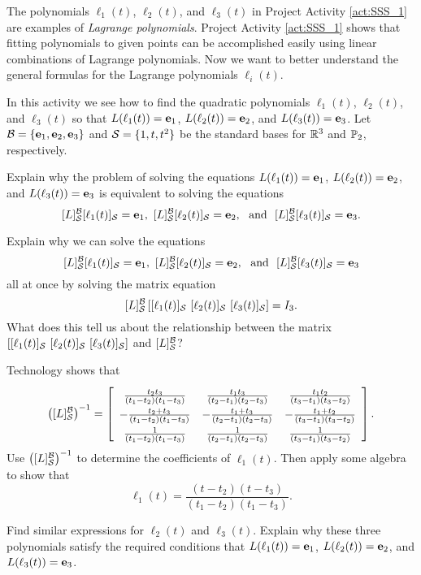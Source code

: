 The polynomials $\ell_1(t)$, $\ell_2(t)$, and $\ell_3(t)$ in Project Activity \ref{act:SSS_1} are examples of \emph{Lagrange polynomials}. Project Activity \ref{act:SSS_1} shows  that fitting polynomials to given points can be accomplished easily using linear combinations of Lagrange polynomials. Now we want to better understand the general formulas for the Lagrange polynomials $\ell_i(t)$. 
 
\begin{pactivity} \label{act:Lagrange_polynomials} In this activity we see how to find the quadratic polynomials $\ell_1(t)$, $\ell_2(t)$, and $\ell_3(t)$ so that $L(\ell_1(t)) =  \mathbf{e}_1$, $L(\ell_2(t)) = \mathbf{e}_2$, and $L(\ell_3(t)) = \mathbf{e}_3$. Let $\mathcal{B} = \{\mathbf{e}_1, \mathbf{e}_2, \mathbf{e}_3\}$ and $\mathcal{S} = \{1,t,t^2\}$ be the standard bases for $\mathbb{R}^3$ and $\mathbb{P}_2$, respectively. 
	\ba
	\item Explain why the problem of solving the equations $L(\ell_1(t)) =  \mathbf{e}_1$, $L(\ell_2(t)) = \mathbf{e}_2$, and $L(\ell_3(t)) = \mathbf{e}_3$ is equivalent to solving the equations 
\[ [L]_{\mathcal{S}}^{\mathcal{B}}[\ell_1(t)]_{\mathcal{S}} = \mathbf{e}_1, \  [L]_{\mathcal{S}}^{\mathcal{B}}[\ell_2(t)]_{\mathcal{S}} =\mathbf{e}_2, \ \text{ and } \  [L]_{\mathcal{S}}^{\mathcal{B}}[\ell_3(t)]_{\mathcal{S}} =\mathbf{e}_3.\]

	
	\item Explain why we can solve the equations 
	\[[L]_{\CS}^{\CB}[\ell_1(t)]_{\CS} = \ve_1, \ [L]_{\CS}^{\CB}[\ell_2(t)]_{\CS} = \ve_2, \ \text{ and } \  [L]_{\CS}^{\CB}[\ell_3(t)]_{\CS}= \ve_3\]
all at once by solving the matrix equation 
\[ [L]_{\mathcal{S}}^{\mathcal{B}} \left[[\ell_1(t)]_{\mathcal{S}} \ [\ell_2(t)]_{\mathcal{S}} \ [\ell_3(t)]_{\mathcal{S}} \right] =  I_3.\]
 What does this tell us about the relationship between the matrix $\left[[\ell_1(t)]_{\CS} \ [\ell_2(t)]_{\CS} \ [\ell_3(t)]_{\CS} \right]$ and $[L]_{\mathcal{S}}^{\mathcal{B}}$?
 
 	\item Technology shows that 
\[\left([L]_{\CS}^{\CB}\right)^{-1} = \left[ \renewcommand{\arraystretch}{1.4} \begin{array}{ccc} \frac{t_2t_3}{(t_1-t_2)(t_1-t_3)} & \frac{t_1t_3}{(t_2-t_1)(t_2-t_3)} & \frac{t_1t_2}{(t_3-t_1)(t_3-t_2)}  \\  -\frac{t_2+t_3}{(t_1-t_2)(t_1-t_3)} & -\frac{t_1+t_3}{(t_2-t_1)(t_2-t_3)} & -\frac{t_1+t_2}{(t_3-t_1)(t_3-t_2)} \\  \frac{1}{(t_1-t_2)(t_1-t_3)} & \frac{1}{(t_2-t_1)(t_2-t_3)} & \frac{1}{(t_3-t_1)(t_3-t_2)} \end{array} \right].\]
Use $\left([L]_{\mathcal{S}}^{\mathcal{B}}\right)^{-1}$ to determine the coefficients of $\ell_1(t)$. Then apply some algebra to show that 
\[\ell_1(t) =  \frac{(t-t_2)(t-t_3)}{(t_1-t_2)(t_1-t_3)}.\]

	\item Find similar expressions for $\ell_2(t)$ and $\ell_3(t)$. Explain why these three polynomials satisfy the required conditions that $L(\ell_1(t)) =  \mathbf{e}_1$, $L(\ell_2(t)) = \mathbf{e}_2$, and $L(\ell_3(t)) = \mathbf{e}_3$. 

	\ea
	
\end{pactivity}

